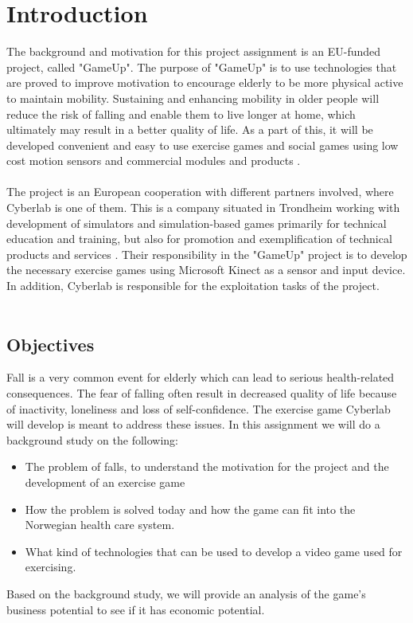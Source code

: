 \chapter{Introduction}
The background and motivation for this project assignment is an EU-funded project, called "GameUp". The purpose of "GameUp" is to use technologies that are proved to improve motivation to encourage elderly to be more physical active to maintain mobility. Sustaining and enhancing mobility in older people will reduce the risk of falling and enable them to live longer at home, which ultimately may result in a better quality of life. As a part of this, it will be developed convenient and easy to use exercise games and social games using low cost motion sensors and commercial modules and products \cite{gameup}.\\ \\ The project is an European cooperation with different partners involved, where Cyberlab is one of them. This is a company situated in Trondheim working with development of simulators and simulation-based games primarily for technical education and training, but also for promotion and exemplification of technical products and services \cite{cyberlab}. Their responsibility in the "GameUp" project is to develop the necessary exercise games using Microsoft Kinect as a sensor and input device. In addition, Cyberlab is responsible for the exploitation tasks of the project.  \\ \\

\section{Objectives}
Fall is a very common event for elderly which can lead to serious health-related consequences. The fear of falling often result in decreased quality of life because of inactivity, loneliness and loss of self-confidence. The exercise game Cyberlab will develop is meant to address these issues. In this assignment we will do a background study on the following:
\begin{itemize}
\renewcommand{\labelitemi}{$\bullet$}
\item The problem of falls, to understand the motivation for the project and the development of an exercise game 
\item How the problem is solved today and how the game can fit into the Norwegian health care system.
\item What kind of technologies that can be used to develop a video game used for exercising.
\end{itemize}
Based on the background study, we will provide an analysis of the game’s business potential to see if it has economic potential.

